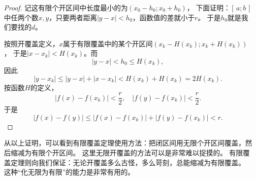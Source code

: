 \documentclass[12pt,UTF8]{ctexbook}
\begin{document}
\begin{appendix}
\begin{proof}
    记这有限个开区间中长度最小的为$(x_0 - h_0; x_0 + h_0)$，
    下面证明：$[\,a; b\,]$中任两个数$x,y$，只要两者距离$|y - x| < h_0$，函数值的差就小于$r$。
    于是$h_0$就是我们要找的$d$。

    按照开覆盖定义，$x$属于有限覆盖中的某个开区间$(x_k - H(x_k); x_k + H(x_k))$，
    于是$|x - x_k| < H(x_k)$。而
    $$|y - x| < h_0 \leqslant H(x_k),$$
    因此
    $$|y - x_k| \leqslant |y - x| + |x - x_k| < H(x_k) + H(x_k) = 2H(x_k).$$
    按函数$H$的定义，
    $$ |f(x) - f(x_k)| < \frac{r}{2}, \quad |f(y) - f(x_k)| < \frac{r}{2}. $$
    于是
    $$ |f(x) - f(y)| \leqslant |f(x) - f(x_k)| + |f(y) - f(x_k)| < r. $$

\end{proof}

从以上证明，可以看到有限覆盖定理使用方法：把闭区间用无限个开区间覆盖，然后缩减为有限个开区间。
这里无限开覆盖的方法可以是非常难以捉摸的。
有限覆盖定理则向我们保证：无论开覆盖多么古怪，多么苛刻，总能缩减为有限覆盖。
这种“化无限为有限”的能力是非常有用的。

\end{appendix}
\end{document}
